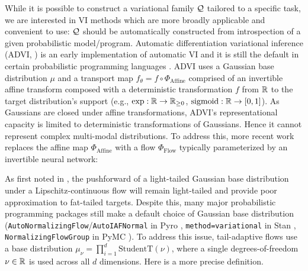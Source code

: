 \documentclass[thesis.tex]{subfiles}
\begin{document}
While it is possible to construct a variational family $\mathcal{Q}$ tailored to a specific task, we are interested in VI methods which are more broadly applicable and convenient to use: $\mathcal{Q}$ should be automatically constructed from introspection of a given probabilistic model/program.
Automatic differentiation variational inference (ADVI, \citet{kucukelbir2017automatic}) is an early implementation of automatic VI and it is still the default in certain probabilistic programming languages \citep{carpenter2017stan}.
ADVI uses a Gaussian base distribution $\mu$ and a transport map $f_\theta = f \circ \Phi_\text{Affine}$ comprised of an invertible affine transform composed with a deterministic transformation $f$ from $\mathbb{R}$ to the target distribution's support (e.g., $\exp : \mathbb{R} \to \mathbb{R}_{\geq 0}$, $\text{sigmoid} : \mathbb{R} \to [0,1]$).
As Gaussians are closed under affine transformations, ADVI's representational capacity is limited to deterministic transformations of Gaussians. Hence it cannot represent complex multi-modal distributions.
To address this, more recent work \citep{kingma2016improved,webb2019improving} replaces the affine map $\Phi_\text{Affine}$ with a flow $\Phi_{\text{Flow}}$ typically parameterized by an invertible neural network:


As first noted in \citet{jaini2020tails}, the pushforward of a light-tailed Gaussian base distribution under a Lipschitz-continuous flow will remain light-tailed and provide poor approximation to fat-tailed targets. 
Despite this, 
many major probabilistic programming packages still make a default choice of Gaussian base distribution (\texttt{AutoNormalizingFlow}/\texttt{AutoIAFNormal} in Pyro \citep{bingham2019pyro}, \texttt{method=variational} in Stan \citep{carpenter2017stan}, \texttt{NormalizingFlowGroup} in PyMC \citep{patil2010pymc}).
To address this issue, tail-adaptive flows \citep{jaini2020tails} use a
base distribution $\mu_\nu = \prod_{i=1}^d \text{StudentT}(\nu)$,
where a single degrees-of-freedom $\nu \in \mathbb{R}$ is used across all $d$ dimensions. Here is a more precise definition.
\end{document}
